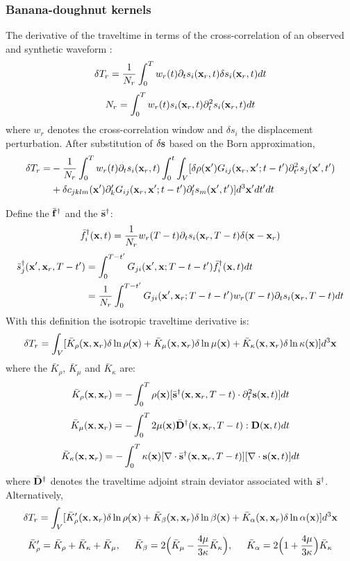 \subsubsection{Banana-doughnut kernels}
The \Frechet derivative of the traveltime in terms of the cross-correlation
of an observed and synthetic waveform
:
\[ \delta T_r=\frac{1}{N_r}\int_0^Tw_r(t)\partial_ts_i(\mathbf{x}_r,t)\delta s_i(\mathbf{x}_r,t)dt \]
\[ N_r=\int_0^Tw_r(t)s_i(\mathbf{x}_r,t)\partial_t^2s_i(\mathbf{x}_r,t)dt \]
where $w_r$ denotes the cross-correlation window and $\delta s_i$ the displacement perturbation.
After substitution of $\delta\mathbf{s}$ based on the Born approximation,
\begin{align*}
  \delta T_r= & -\frac{1}{N_r}\int_0^Tw_r(t)\partial_ts_i(\mathbf{x}_r,t)\int_0^t\int_V[\delta\rho(\mathbf{x}')G_{ij}(\mathbf{x}_r,\mathbf{x}';t-t')\partial_{t'}^2s_j(\mathbf{x}',t') \\
    & +\delta c_{jklm}(\mathbf{x}')\partial_k^\prime G_{ij}(\mathbf{x}_r,\mathbf{x}';t-t')\partial_l^\prime s_m(\mathbf{x}',t')]d^3\mathbf{x}'dt'dt
\end{align*}

Define the  $\bar{\mathbf{f}}^\dagger$
and the  $\bar{\mathbf{s}}^\dagger$:
\[ \bar f_i^\dagger(\mathbf{x},t)=\frac{1}{N_r}w_r(T-t)\partial_ts_i(\mathbf{x}_r,T-t)\delta(\mathbf{x}-\mathbf{x}_r) \]
\begin{align*}
  \bar s_j^\dagger(\mathbf{x}',\mathbf{x}_r,T-t') & =\int_0^{T-t'}G_{ji}(\mathbf{x}',\mathbf{x};T-t-t')\bar f_i^\dagger(\mathbf{x},t)dt \\
    & =\frac{1}{N_r}\int_0^{T-t'}G_{ji}(\mathbf{x}',\mathbf{x}_r;T-t-t')w_r(T-t)\partial_ts_i(\mathbf{x}_r,T-t)dt
\end{align*}
With this definition the isotropic traveltime \Frechet derivative is:
\[ \delta T_r=\int_V[\bar K_\rho(\mathbf{x},\mathbf{x}_r)\delta\ln\rho(\mathbf{x})+\bar K_\mu(\mathbf{x},\mathbf{x}_r)\delta\ln\mu(\mathbf{x})+\bar K_\kappa(\mathbf{x},\mathbf{x}_r)\delta\ln\kappa(\mathbf{x})]d^3\mathbf{x} \]
where the  $\bar K_\rho$, $\bar K_\mu$ and $\bar K_\kappa$ are:
\[ \bar K_\rho(\mathbf{x},\mathbf{x}_r)=-\int_0^T\rho(\mathbf{x})[\bar{\mathbf{s}}^\dagger(\mathbf{x},\mathbf{x}_r,T-t)\cdot\partial_t^2\mathbf{s}(\mathbf{x},t)]dt \]
\[ \bar K_\mu(\mathbf{x},\mathbf{x}_r)=-\int_0^T2\mu(\mathbf{x})\bar{\mathbf{D}}^\dagger(\mathbf{x},\mathbf{x}_r,T-t):\mathbf{D}(\mathbf{x},t)dt \]
\[ \bar K_\kappa(\mathbf{x},\mathbf{x}_r)=-\int_0^T\kappa(\mathbf{x})[\nabla\cdot\bar{\mathbf{s}}^\dagger(\mathbf{x},\mathbf{x}_r,T-t)][\nabla\cdot\mathbf{s}(\mathbf{x},t)]dt \]
where $\bar{\mathbf{D}}^\dagger$ denotes the traveltime adjoint strain deviator
associated with $\bar{\mathbf{s}}^\dagger$.
Alternatively,
\[ \delta T_r=\int_V[\bar K_\rho^\prime(\mathbf{x},\mathbf{x}_r)\delta\ln\rho(\mathbf{x})+\bar K_\beta(\mathbf{x},\mathbf{x}_r)\delta\ln\beta(\mathbf{x})+\bar K_\alpha(\mathbf{x},\mathbf{x}_r)\delta\ln\alpha(\mathbf{x})]d^3\mathbf{x} \]
\[ \bar K_\rho^\prime=\bar K_\rho+\bar K_\kappa+\bar K_\mu, \hspace{5mm} \bar K_\beta=2\Big(\bar K_\mu-\frac{4\mu}{3\kappa}\bar K_\kappa\Big), \hspace{5mm} \bar K_\alpha=2\Big(1+\frac{4\mu}{3\kappa}\Big)\bar K_\kappa \]

